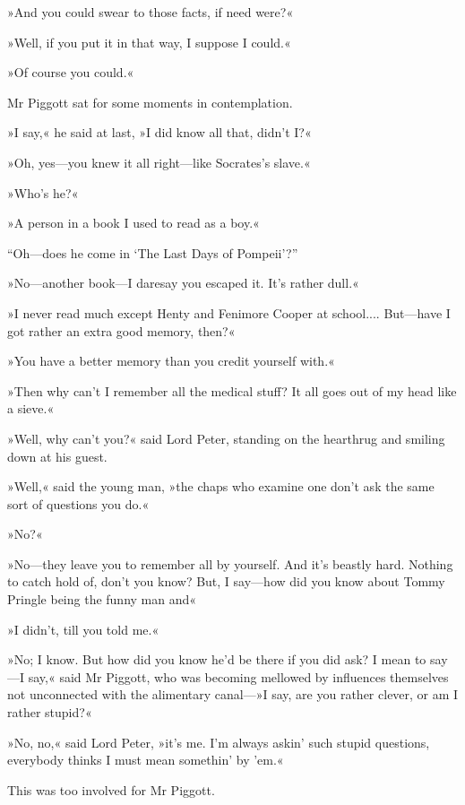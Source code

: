 »And you could swear to those facts, if need were?«

»Well, if you put it in that way, I suppose I could.«

»Of course you could.«

Mr Piggott sat for some moments in contemplation.

»I say,« he said at last, »I did know all that, didn't I?«

»Oh, yes\allowbreak---\allowbreak you knew it all right\allowbreak---\allowbreak like Socrates's slave.«

»Who's he?«

»A person in a book I used to read as a boy.«

“Oh\allowbreak---\allowbreak does he come in ‘The Last Days of Pompeii'?”

»No\allowbreak---\allowbreak another book\allowbreak---\allowbreak I daresay you escaped it. It's rather dull.«

»I never read much except Henty and Fenimore Cooper at school.... But\allowbreak---\allowbreak have I got rather an extra good memory, then?«

»You have a better memory than you credit yourself with.«

»Then why can't I remember all the medical stuff? It all goes out of my head like a sieve.«

»Well, why can't you?« said Lord Peter, standing on the hearthrug and smiling down at his guest.

»Well,« said the young man, »the chaps who examine one don't ask the same sort of questions you do.«

»No?«

»No\allowbreak---\allowbreak they leave you to remember all by yourself. And it's beastly hard. Nothing to catch hold of, don't you know? But, I say\allowbreak---\allowbreak how did you know about Tommy Pringle being the funny man and\longdash«

»I didn't, till you told me.«

»No; I know. But how did you know he'd be there if you did ask? I mean to say\allowbreak---\allowbreak I say,« said Mr Piggott, who was becoming mellowed by influences themselves not unconnected with the alimentary canal---»I say, are you rather clever, or am I rather stupid?«

»No, no,« said Lord Peter, »it's me. I'm always askin' such stupid questions, everybody thinks I must mean somethin' by 'em.«

This was too involved for Mr Piggott.

